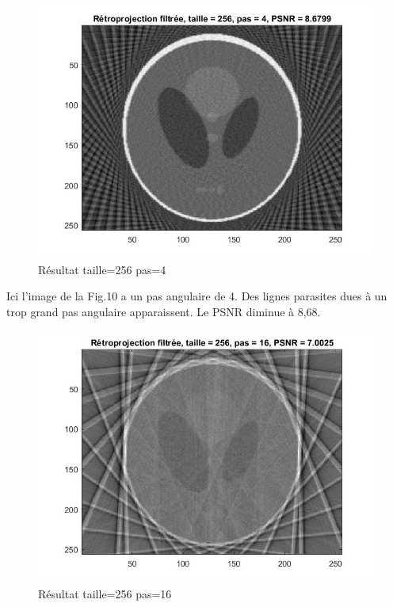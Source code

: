 \documentclass[conference]{IEEEtran}
\begin{document}
\begin{figure}[H]
\centering
\includegraphics[scale=0.38]{taille=256-pas=4}
	\caption[Résultat taille=256 pas=4]{Résultat taille=256 pas=4}
\label{fig:gallery}
\end{figure}

Ici l'image de la Fig.10 a un pas angulaire de 4. Des lignes parasites dues à un trop grand pas angulaire apparaissent. Le PSNR diminue à 8,68.

\begin{figure}[H]
\centering
\includegraphics[scale=0.38]{taille=256-pas=16}
	\caption[Résultat taille=256 pas=16]{Résultat taille=256 pas=16}
\label{fig:gallery}
\end{figure}
\end{document}
